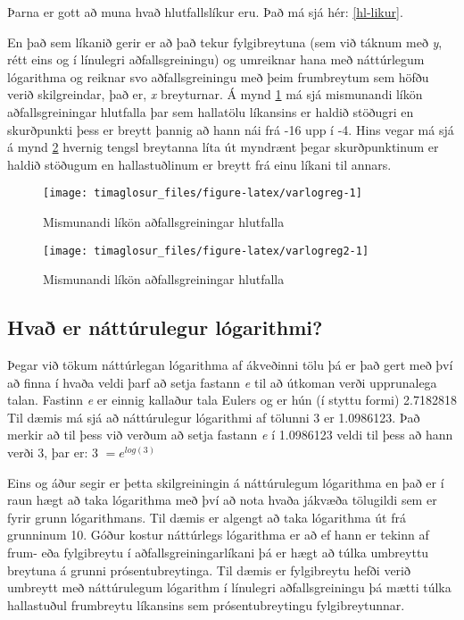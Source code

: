 \documentclass[]{book}
\begin{document}
Þarna er gott að muna hvað hlutfallslíkur eru. Það má sjá hér: \ref{hl-likur}.

En það sem líkanið gerir er að það tekur fylgibreytuna (sem við táknum með \emph{y}, rétt eins og í línulegri aðfallsgreiningu) og umreiknar hana með náttúrlegum lógarithma og reiknar svo aðfallsgreiningu með þeim frumbreytum sem höfðu verið skilgreindar, það er, \emph{x} breyturnar. Á mynd \ref{fig:varlogreg} má sjá mismunandi líkön aðfallsgreiningar hlutfalla þar sem hallatölu líkansins er haldið stöðugri en skurðpunkti þess er breytt þannig að hann nái frá -16 upp í -4. Hins vegar má sjá á mynd \ref{fig:varlogreg2} hvernig tengsl breytanna líta út myndrænt þegar skurðpunktinum er haldið stöðugum en hallastuðlinum er breytt frá einu líkani til annars.

\begin{figure}

{\centering \texttt{[image: timaglosur\_files/figure-latex/varlogreg-1]} 

}

\caption{Mismunandi líkön aðfallsgreiningar hlutfalla}\label{fig:varlogreg}
\end{figure}

\begin{figure}

{\centering \texttt{[image: timaglosur\_files/figure-latex/varlogreg2-1]} 

}

\caption{Mismunandi líkön aðfallsgreiningar hlutfalla}\label{fig:varlogreg2}
\end{figure}

\hypertarget{hvauxf0-er-nuxe1ttuxfarulegur-luxf3garithmi}{%
\subsection{Hvað er náttúrulegur lógarithmi?}\label{hvauxf0-er-nuxe1ttuxfarulegur-luxf3garithmi}}

Þegar við tökum náttúrlegan lógarithma af ákveðinni tölu þá er það gert með því að finna í hvaða veldi þarf að setja fastann \emph{e} til að útkoman verði upprunalega talan. Fastinn \emph{e} er einnig kallaður tala Eulers og er hún (í styttu formi) 2.7182818 Til dæmis má sjá að náttúrulegur lógarithmi af tölunni 3 er 1.0986123. Það merkir að til þess við verðum að setja fastann \emph{e} í 1.0986123 veldi til þess að hann verði 3, þar er: 3 \(= e^{log(3)}\)

Eins og áður segir er þetta skilgreiningin á náttúrulegum lógarithma en það er í raun hægt að taka lógarithma með því að nota hvaða jákvæða tölugildi sem er fyrir grunn lógarithmans. Til dæmis er algengt að taka lógarithma út frá grunninum 10. Góður kostur náttúrlegs lógarithma er að ef hann er tekinn af frum- eða fylgibreytu í aðfallsgreiningarlíkani þá er hægt að túlka umbreyttu breytuna á grunni prósentubreytinga. Til dæmis er fylgibreytu hefði verið umbreytt með náttúrulegum lógarithm í línulegri aðfallsgreiningu þá mætti túlka hallastuðul frumbreytu líkansins sem prósentubreytingu fylgibreytunnar.
\end{document}
